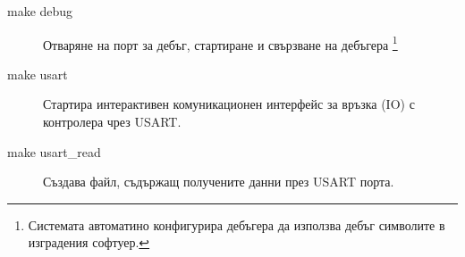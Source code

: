 \documentclass{beamer}
\begin{document}
\begin{frame}[t]
	\begin{block}{ }
	\begin{description}
		\pause
		\item[make debug] Отваряне на порт за дебъг, стартиране и свързване на дебъгера
		\footnote{Системата автоматино конфигурира дебъгера да използва дебъг символите в изградения софтуер.}

		\pause
		\item[make usart] Стартира интерактивен комуникационен интерфейс за връзка (IO) с контролера чрез USART.

		\pause
		\item[make usart\_read] Създава файл, съдържащ получените данни през USART порта.

	\end{description}
	\end{block}
\end{frame}
\end{document}
